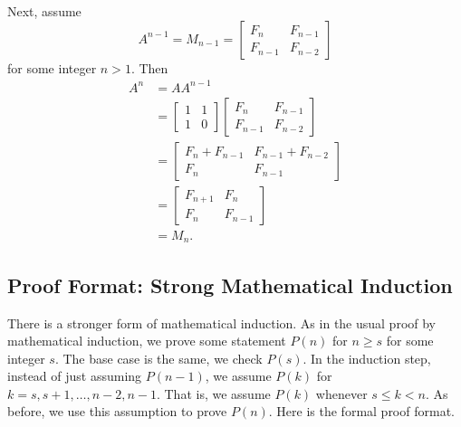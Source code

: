\begin{exam}
\begin{apart}
\begin{soln}
                    Next, assume $$A^{n-1} = M_{n-1} = \left[ \begin{array}{cc} F_n & F_{n-1} \\ F_{n-1} & F_{n-2} \end{array} \right]$$
                    for some integer $n > 1$.  Then 
                        \begin{align*}
                            A^n & = AA^{n-1} \\
                            & = \left[ \begin{array}{cc} 1 & 1\\ 1 & 0 \end{array} \right]\left[ \begin{array}{cc} F_n & F_{n-1} \\ F_{n-1} & F_{n-2} \end{array} \right] \\
                            & = \left[ \begin{array}{cc} F_n+F_{n-1} & F_{n-1}+F_{n-2}\\ F_n & F_{n-1} \end{array} \right] \\
                            & = \left[ \begin{array}{cc} F_{n+1} & F_n\\ F_n & F_{n-1} \end{array} \right] \\ 
                            & =M_n.
                        \end{align*}                        
                \end{soln}
        \end{apart} 
\end{exam}


\newcommand{\subpffstrongind}{Proof Format: Strong Mathematical Induction}
\subsection{\subpffstrongind}
\label{sub_pff_strong_math_ind}

There is a stronger form of mathematical induction.  As in the usual proof by mathematical induction, we prove some statement $P(n)$ for $n \ge s$ for some integer $s$. The base case is the same, we check $P(s)$.  In the induction step, instead of just assuming $P(n-1)$, we assume $P(k)$ for $k= s, s+1, \ldots, n-2, n-1$.  That is, we assume $P(k)$ whenever $s \le k < n$.  As before, we use this assumption to prove $P(n)$.  Here is the formal proof format.

